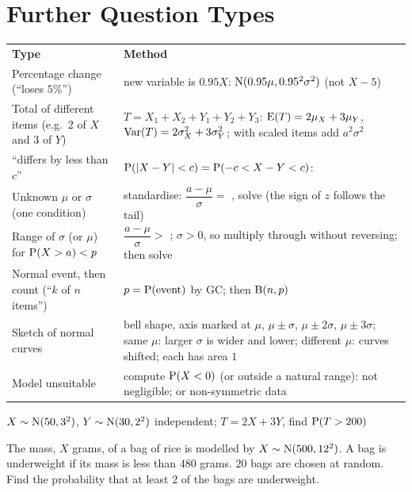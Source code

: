 \section{Further Question Types}
\begin{center}\renewcommand{\arraystretch}{1.12}\footnotesize
\begin{tabular}{|L{4.6cm}|L{10.6cm}|}\hline
\textbf{Type} & \textbf{Method}\\\Xhline{2pt}
Percentage change (``loses $5\%$'') & new variable is $0.95X$: $\mathrm{N}(0.95\mu,0.95^{2}\sigma^{2})$ (not $X-5$)\\\hline
Total of different items (e.g.\ $2$ of $X$ and $3$ of $Y$) & $T=X_{1}+X_{2}+Y_{1}+Y_{2}+Y_{3}$: $\mathrm{E}(T)=2\mu_{X}+3\mu_{Y}$, $\mathrm{Var}(T)=2\sigma_{X}^{2}+3\sigma_{Y}^{2}$; with scaled items add $a^{2}\sigma^{2}$\\\hline
``differs by less than $c$'' & $\mathrm{P}(|X-Y|<c)=\mathrm{P}(-c<X-Y<c)$: \\\hline
Unknown $\mu$ or $\sigma$ (one condition) & standardise: $\dfrac{a-\mu}{\sigma}=$ , solve (the sign of $z$ follows the tail)\\\hline
Range of $\sigma$ (or $\mu$) for $\mathrm{P}(X>a)<p$ & $\dfrac{a-\mu}{\sigma}>$ ; $\sigma>0$, so multiply through without reversing; then solve\\\hline
Normal event, then count (``$k$ of $n$ items'') & $p=\mathrm{P}(\text{event})$ by GC; then $\mathrm{B}(n,p)$\\\hline
Sketch of normal curves & bell shape, axis marked at $\mu$, $\mu\pm\sigma$, $\mu\pm2\sigma$, $\mu\pm3\sigma$; same $\mu$: larger $\sigma$ is wider and lower; different $\mu$: curves shifted; each has area $1$\\\hline
Model unsuitable & compute $\mathrm{P}(X<0)$ (or outside a natural range): not negligible; or non-symmetric data\\\hline
\end{tabular}\end{center}
\noindent\begin{minipage}[t]{0.48\textwidth}
\exlab $X\sim\mathrm{N}(50,3^{2})$, $Y\sim\mathrm{N}(30,2^{2})$ independent; $T=2X+3Y$, find $\mathrm{P}(T>200)$
\end{minipage}\hfill
\begin{minipage}[t]{0.48\textwidth}
\exlab The mass, $X$ grams, of a bag of rice is modelled by $X\sim\mathrm{N}(500,12^{2})$. A bag is underweight if its mass is less than $480$ grams. $20$ bags are chosen at random. Find the probability that at least $2$ of the bags are underweight.
\end{minipage}
